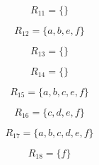 \documentclass{scrreprt}
\begin{document}
\begin{equation}
  R_{11} = \{ \}
\end{equation}

\begin{equation}
  R_{12} = \{ a, b, e, f \}
\end{equation}

\begin{equation}
  R_{13} = \{ \}
\end{equation}

\begin{equation}
  R_{14} = \{ \}
\end{equation}

\begin{equation}
  R_{15} = \{ a, b, c, e, f \}
\end{equation}

\begin{equation}
  R_{16} = \{ c, d, e, f \}
\end{equation}

\begin{equation}
  R_{17} = \{ a, b, c, d, e, f \}
\end{equation}

\begin{equation}
  R_{18} = \{ f \}
\end{equation}
\end{document}
